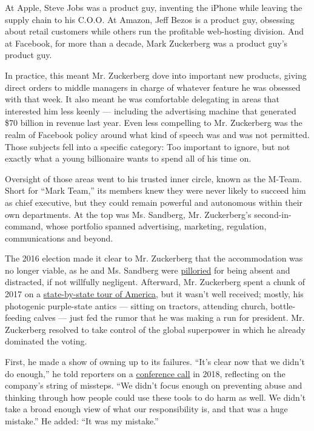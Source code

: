 At Apple, Steve Jobs was a product guy, inventing the iPhone while
leaving the supply chain to his C.O.O. At Amazon, Jeff Bezos is a
product guy, obsessing about retail customers while others run the
profitable web-hosting division. And at Facebook, for more than a
decade, Mark Zuckerberg was a product guy's product guy.

In practice, this meant Mr. Zuckerberg dove into important new products,
giving direct orders to middle managers in charge of whatever feature he
was obsessed with that week. It also meant he was comfortable delegating
in areas that interested him less keenly --- including the advertising
machine that generated \$70 billion in revenue last year. Even less
compelling to Mr. Zuckerberg was the realm of Facebook policy around
what kind of speech was and was not permitted. Those subjects fell into
a specific category: Too important to ignore, but not exactly what a
young billionaire wants to spend all of his time on.

Oversight of those areas went to his trusted inner circle, known as the
M-Team. Short for ``Mark Team,'' its members knew they were never likely
to succeed him as chief executive, but they could remain powerful and
autonomous within their own departments. At the top was Ms. Sandberg,
Mr. Zuckerberg's second-in-command, whose portfolio spanned advertising,
marketing, regulation, communications and beyond.

The 2016 election made it clear to Mr. Zuckerberg that the accommodation
was no longer viable, as he and Ms. Sandberg were
\href{https://www.nytimes3xbfgragh.onion/2018/11/14/technology/facebook-data-russia-election-racism.html}{pilloried}
for being absent and distracted, if not willfully negligent. Afterward,
Mr. Zuckerberg spent a chunk of 2017 on a
\href{https://www.nytimes3xbfgragh.onion/2017/05/25/technology/zuckerberg-harvard-commencement-road-trip.html}{state-by-state
tour of America}, but it wasn't well received; mostly, his photogenic
purple-state antics --- sitting on tractors, attending church,
bottle-feeding calves --- just fed the rumor that he was making a run
for president. Mr. Zuckerberg resolved to take control of the global
superpower in which he already dominated the voting.

First, he made a show of owning up to its failures. ``It's clear now
that we didn't do enough,'' he told reporters on a
\href{https://about.fb.com/news/2018/04/hard-questions-protecting-peoples-information/}{conference
call} in 2018, reflecting on the company's string of missteps. ``We
didn't focus enough on preventing abuse and thinking through how people
could use these tools to do harm as well. We didn't take a broad enough
view of what our responsibility is, and that was a huge mistake.'' He
added: ``It was my mistake.''

